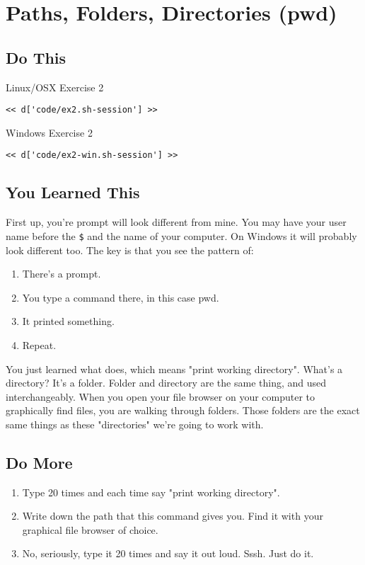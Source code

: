 \chapter{Paths, Folders, Directories (pwd)}

\section{Do This}

\begin{code}{Linux/OSX Exercise 2}
\begin{Verbatim}
<< d['code/ex2.sh-session'] >>
\end{Verbatim}
\end{code}

\begin{code}{Windows Exercise 2}
\begin{Verbatim}
<< d['code/ex2-win.sh-session'] >>
\end{Verbatim}
\end{code}

\section{You Learned This}

First up, you're prompt will look different from mine.  You may have your user
name before the \verb|$| and the name of your computer.  On Windows it will
probably look different too.  The key is that you see the pattern of:

\begin{enumerate}
\item There's a prompt.
\item You type a command there, in this case pwd.
\item It printed something.
\item Repeat.
\end{enumerate}

You just learned what  does, which means "print working
directory".  What's a directory?  It's a folder.  Folder and directory are the
same thing, and used interchangeably.  When you open your file browser on your
computer to graphically find files, you are walking through folders.  Those
folders are the exact same things as these "directories" we're going to work
with.

\section{Do More}

\begin{enumerate}
\item Type  20 times and each time say "print working directory".
\item Write down the path that this command gives you.  Find it with your 
    graphical file browser of choice.
\item No, seriously, type it 20 times and say it out loud.  Sssh.  Just do it.
\end{enumerate}

